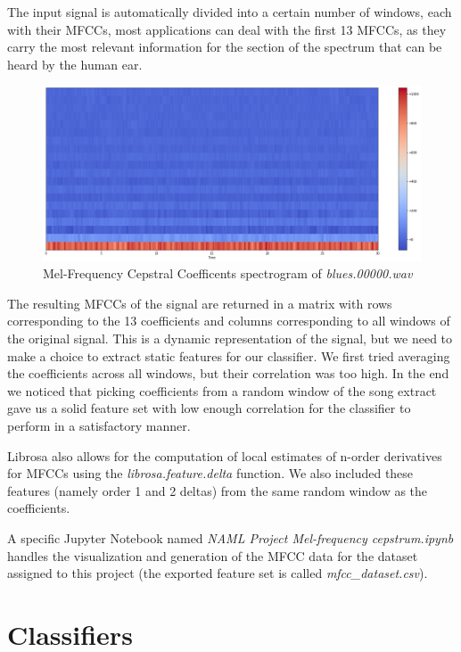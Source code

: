 \documentclass[12pt]{article}
\begin{document}
	The input signal is automatically divided into a certain number of windows, each with their MFCCs, most applications can deal with the first 13 MFCCs, as they carry the most relevant information for the section of the spectrum that can be heard by the human ear.
	\begin{figure}[H]
		\includegraphics[scale=0.4]{mfcc_spectrogram}
		\caption{Mel-Frequency Cepstral Coefficents spectrogram of \textit{blues.00000.wav}}
	\end{figure}
	
	The resulting MFCCs of the signal are returned in a matrix with rows corresponding to the 13 coefficients and columns corresponding to all windows of the original signal. This is a dynamic representation of the signal, but we need to make a choice to extract static features for our classifier. We first tried averaging the coefficients across all windows, but their correlation was too high. In the end we noticed that picking coefficients from a random window of the song extract gave us a solid feature set with low enough correlation for the classifier to perform in a satisfactory manner.
	
	Librosa also allows for the computation of local estimates of n-order derivatives for MFCCs using the \textit{librosa.feature.delta} function. We also included these features (namely order 1 and 2 deltas) from the same random window as the coefficients. 
	
	A specific Jupyter Notebook named \textit{NAML Project Mel-frequency cepstrum.ipynb} handles the visualization and generation of the MFCC data for the dataset assigned to this project (the exported feature set is called \textit{mfcc\_dataset.csv}).
	
	\newpage
	
	\section{Classifiers}
\end{document}
